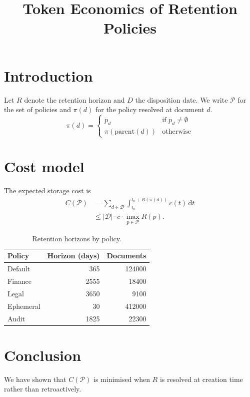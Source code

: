 \documentclass[11pt]{article}
\title{Token Economics of Retention Policies}
\begin{document}
\maketitle
\section{Introduction}
Let $R$ denote the retention horizon and $D$ the disposition date. We write $\mathcal{P}$ for the set of policies and $\pi(d)$ for the policy resolved at document $d$.
\begin{equation}
  \pi(d) = \begin{cases} p_d & \text{if } p_d \neq \emptyset \\ \pi(\mathrm{parent}(d)) & \text{otherwise} \end{cases}
\end{equation}
\section{Cost model}
The expected storage cost is
\begin{align}
  C(\mathcal{P}) &= \sum_{d \in \mathcal{D}} \int_{t_0}^{t_0 + R(\pi(d))} c(t)\,\mathrm{d}t \\
                 &\leq |\mathcal{D}| \cdot \bar{c} \cdot \max_{p \in \mathcal{P}} R(p).
\end{align}
\begin{table}[h]
  \centering
  \begin{tabular}{lrr}
    \toprule
    Policy & Horizon (days) & Documents \\
    \midrule
    Default & 365 & 124000 \\
    Finance & 2555 & 18400 \\
    Legal & 3650 & 9100 \\
    Ephemeral & 30 & 412000 \\
    Audit & 1825 & 22300 \\
    \bottomrule
  \end{tabular}
  \caption{Retention horizons by policy.}
\end{table}
\section{Conclusion}
We have shown that $C(\mathcal{P})$ is minimised when $R$ is resolved at creation time rather than retroactively.
\end{document}
